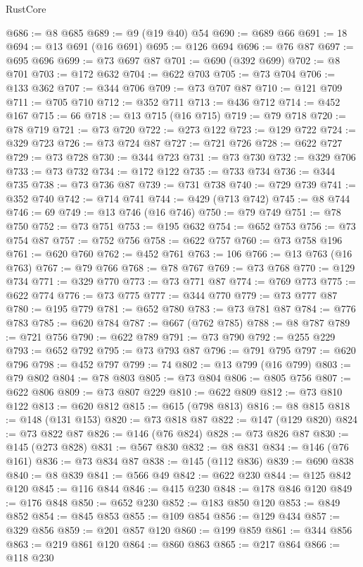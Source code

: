 \begin{lexlean}{RustCore}
\begin{coremodule}
@686 := @8 @685
@689 := @9 (@19 @40) @54
@690 := @689 @66
@691 := 18
@694 := @13 @691 (@16 @691)
@695 := @126 @694
@696 := @76 @87
@697 := @695 @696
@699 := @73 @697 @87
@701 := @690 (@392 @699)
@702 := @8 @701
@703 := @172 @632
@704 := @622 @703
@705 := @73 @704
@706 := @133 @362
@707 := @344 @706
@709 := @73 @707 @87
@710 := @121 @709
@711 := @705 @710
@712 := @352 @711
@713 := @436 @712
@714 := @452 @167
@715 := 66
@718 := @13 @715 (@16 @715)
@719 := @79 @718
@720 := @78 @719
@721 := @73 @720
@722 := @273 @122
@723 := @129 @722
@724 := @329 @723
@726 := @73 @724 @87
@727 := @721 @726
@728 := @622 @727
@729 := @73 @728
@730 := @344 @723
@731 := @73 @730
@732 := @329 @706
@733 := @73 @732
@734 := @172 @122
@735 := @733 @734
@736 := @344 @735
@738 := @73 @736 @87
@739 := @731 @738
@740 := @729 @739
@741 := @352 @740
@742 := @714 @741
@744 := @429 (@713 @742)
@745 := @8 @744
@746 := 69
@749 := @13 @746 (@16 @746)
@750 := @79 @749
@751 := @78 @750
@752 := @73 @751
@753 := @195 @632
@754 := @652 @753
@756 := @73 @754 @87
@757 := @752 @756
@758 := @622 @757
@760 := @73 @758 @196
@761 := @620 @760
@762 := @452 @761
@763 := 106
@766 := @13 @763 (@16 @763)
@767 := @79 @766
@768 := @78 @767
@769 := @73 @768
@770 := @129 @734
@771 := @329 @770
@773 := @73 @771 @87
@774 := @769 @773
@775 := @622 @774
@776 := @73 @775
@777 := @344 @770
@779 := @73 @777 @87
@780 := @195 @779
@781 := @652 @780
@783 := @73 @781 @87
@784 := @776 @783
@785 := @620 @784
@787 := @667 (@762 @785)
@788 := @8 @787
@789 := @721 @756
@790 := @622 @789
@791 := @73 @790
@792 := @255 @229
@793 := @652 @792
@795 := @73 @793 @87
@796 := @791 @795
@797 := @620 @796
@798 := @452 @797
@799 := 74
@802 := @13 @799 (@16 @799)
@803 := @79 @802
@804 := @78 @803
@805 := @73 @804
@806 := @805 @756
@807 := @622 @806
@809 := @73 @807 @229
@810 := @622 @809
@812 := @73 @810 @122
@813 := @620 @812
@815 := @615 (@798 @813)
@816 := @8 @815
@818 := @148 (@131 @153)
@820 := @73 @818 @87
@822 := @147 (@129 @820)
@824 := @73 @822 @87
@826 := @146 (@76 @824)
@828 := @73 @826 @87
@830 := @145 (@273 @828)
@831 := @567 @830
@832 := @8 @831
@834 := @146 (@76 @161)
@836 := @73 @834 @87
@838 := @145 (@112 @836)
@839 := @690 @838
@840 := @8 @839
@841 := @566 @49
@842 := @622 @230
@844 := @125 @842 @120
@845 := @116 @844
@846 := @415 @230
@848 := @178 @846 @120
@849 := @176 @848
@850 := @652 @230
@852 := @183 @850 @120
@853 := @849 @852
@854 := @845 @853
@855 := @109 @854
@856 := @129 @434
@857 := @329 @856
@859 := @201 @857 @120
@860 := @199 @859
@861 := @344 @856
@863 := @219 @861 @120
@864 := @860 @863
@865 := @217 @864
@866 := @118 @230

\end{coremodule}
\end{lexlean}
